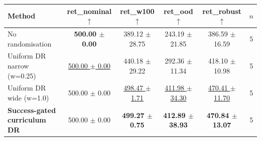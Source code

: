 \begin{tabular}{lccccc}
\toprule
Method & ret\_nominal $\uparrow$ & ret\_w100 $\uparrow$ & ret\_ood $\uparrow$ & ret\_robust $\uparrow$ & $n$ \\
\midrule
No randomisation & \textbf{500.00 $\pm$ 0.00} & 389.12 $\pm$ 28.75 & 243.19 $\pm$ 21.85 & 386.59 $\pm$ 16.59 & 5 \\
Uniform DR narrow (w=0.25) & \underline{500.00 $\pm$ 0.00} & 440.18 $\pm$ 29.22 & 292.36 $\pm$ 11.34 & 418.10 $\pm$ 10.98 & 5 \\
Uniform DR wide (w=1.0) & 500.00 $\pm$ 0.00 & \underline{498.47 $\pm$ 1.71} & \underline{411.98 $\pm$ 34.30} & \underline{470.41 $\pm$ 11.70} & 5 \\
\textbf{Success-gated curriculum DR} & 500.00 $\pm$ 0.00 & \textbf{499.27 $\pm$ 0.75} & \textbf{412.89 $\pm$ 38.93} & \textbf{470.84 $\pm$ 13.07} & 5 \\
\bottomrule
\end{tabular}
